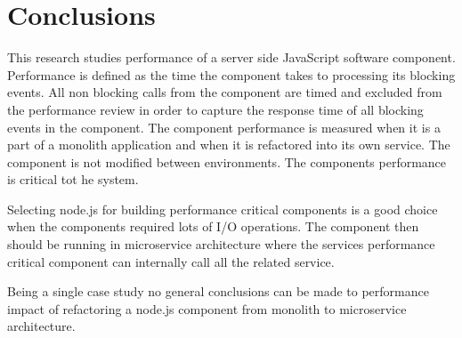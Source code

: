 \chapter{Conclusions\label{conclusions}}
This research studies performance of a server side JavaScript software component.
Performance is defined as the time the component takes to processing its blocking events.
All non blocking calls from the component are timed and excluded from the performance review in order to capture the response time of all blocking events in the component.
The component performance is measured when it is a part of a monolith application and when it is refactored into its own service.
The component is not modified between environments.
The components performance is critical tot he system.

Selecting node.js for building performance critical components is a good choice when the components required lots of I/O operations.
The component then should be running in microservice architecture where the services performance critical component can internally call all the related service.

Being a single case study no general conclusions can be made to performance impact of refactoring a node.js component from monolith to microservice architecture.